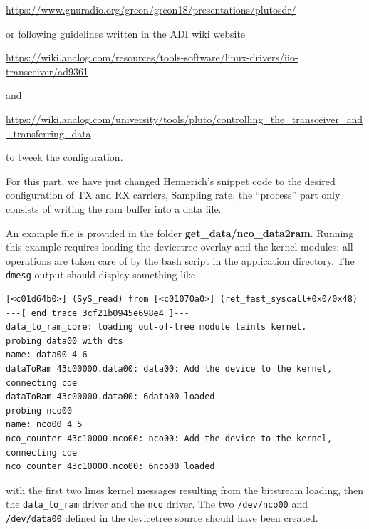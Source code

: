\documentclass{article}
\begin{document}
\href{https://www.gnuradio.org/grcon/grcon18/presentations/plutosdr/}{https://www.gnuradio.org/grcon/grcon18/presentations/plutosdr/}

or following guidelines written in the ADI wiki website

\href{https://wiki.analog.com/resources/tools-software/linux-drivers/iio-transceiver/ad9361}{https://wiki.analog.com/resources/tools-software/linux-drivers/iio-transceiver/ad9361}

and 

\href{https://wiki.analog.com/university/tools/pluto/controlling\_the\_transceiver\_and\_transferring\_data}{https://wiki.analog.com/university/tools/pluto/controlling\_the\_transceiver\_and\_transferring\_data}

to tweek the configuration.

For this part, we have just changed Hennerich's snippet code to the desired
configuration of TX and RX carriers, Sampling rate, the ``process'' part only
consists of writing the ram buffer into a data file.

An example file is provided in the folder {\bf{get\_data/nco\_data2ram}}. Running this example
requires loading the devicetree overlay and the kernel modules: all operations are taken care
of by the bash script in the application directory. The {\tt dmesg} output should display
something like
{\footnotesize
\begin{verbatim}
[<c01d64b0>] (SyS_read) from [<c01070a0>] (ret_fast_syscall+0x0/0x48)           
---[ end trace 3cf21b0945e698e4 ]---                                            
data_to_ram_core: loading out-of-tree module taints kernel.                     
probing data00 with dts                                                         
name: data00 4 6                                                                
dataToRam 43c00000.data00: data00: Add the device to the kernel, connecting cde 
dataToRam 43c00000.data00: 6data00 loaded                                       
probing nco00                                                                   
name: nco00 4 5                                                                 
nco_counter 43c10000.nco00: nco00: Add the device to the kernel, connecting cde 
nco_counter 43c10000.nco00: 6nco00 loaded                                       
\end{verbatim}
}
with the first two lines kernel messages resulting from the bitstream loading, then the
{\tt data\_to\_ram} driver and the {\tt nco} driver. The two {\tt /dev/nco00} and {\tt /dev/data00}
defined in the devicetree source should have been created.
\end{document}
